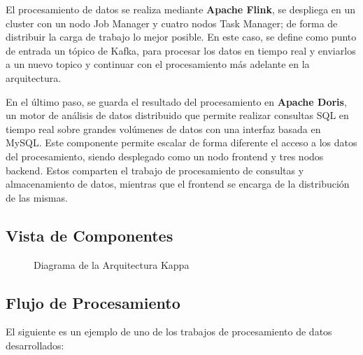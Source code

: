 El procesamiento de datos se realiza mediante \textbf{Apache Flink},
se despliega en un cluster con un nodo Job Manager y cuatro nodos Task Manager; de forma de distribuir la carga de trabajo lo mejor posible.
En este caso, se define como punto de entrada un tópico de Kafka, para procesar los datos en tiempo real y
enviarlos a un nuevo topico y continuar con el procesamiento más adelante en la arquitectura.

En el último paso, se guarda el resultado del procesamiento en \textbf{Apache Doris}, un motor de análisis de datos
distribuido que permite realizar consultas SQL en tiempo real sobre grandes volúmenes de datos con una interfaz basada en MySQL.
Este componente permite escalar de forma diferente el acceso a los datos del procesamiento, 
siendo desplegado como un nodo frontend y tres nodos backend. 
Estos comparten el trabajo de procesamiento de consultas y almacenamiento de datos, 
mientras que el frontend se encarga de la distribución de las mismas. 

\newpage
\subsection{Vista de Componentes}

\begin{figure}[h]
    \caption{Diagrama de la Arquitectura Kappa}
    \label{fig:des_arquitectura_kappa}
\end{figure}

\newpage

\subsection{Flujo de Procesamiento}

El siguiente es un ejemplo de uno de los trabajos de procesamiento de datos desarrollados:


